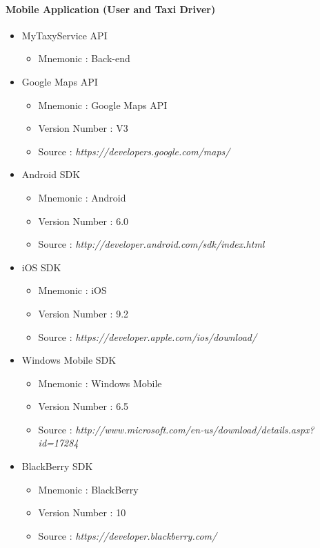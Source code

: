 \documentclass[12pt, a4paper]{article}
\begin{document}
\paragraph{Mobile Application (User and Taxi Driver)} 
\begin{itemize}
	\item MyTaxyService API
	\begin{itemize}
		\item Mnemonic : Back-end
	\end{itemize}
	\item Google Maps API
	\begin{itemize}
		\item Mnemonic : Google Maps API
		\item Version Number : V3
		\item Source : \emph{https://developers.google.com/maps/} 
	\end{itemize}

	\item Android SDK
	\begin{itemize}
		\item Mnemonic : Android
		\item Version Number : 6.0
		\item Source : \emph{http://developer.android.com/sdk/index.html} 
	\end{itemize}

	\item iOS SDK
	\begin{itemize}
		\item Mnemonic : iOS
		\item Version Number : 9.2
		\item Source : \emph{https://developer.apple.com/ios/download/} 
	\end{itemize}

	\item Windows Mobile SDK
	\begin{itemize}
		\item Mnemonic : Windows Mobile
		\item Version Number : 6.5
		\item Source : \emph{http://www.microsoft.com/en-us/download/details.aspx?id=17284} 
	\end{itemize}

	\item BlackBerry SDK
	\begin{itemize}
		\item Mnemonic : BlackBerry
		\item Version Number : 10
		\item Source : \emph{https://developer.blackberry.com/} 
	\end{itemize}		
\end{itemize}
\end{document}
